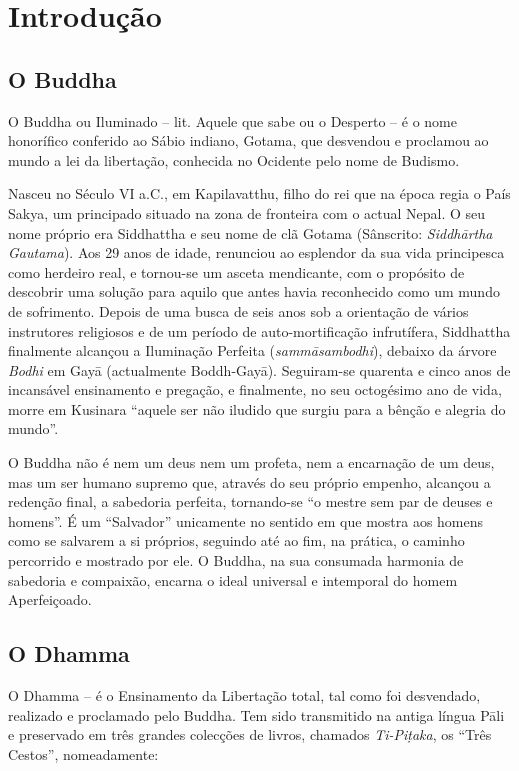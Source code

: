 \chapter{Introdução}

\section{O Buddha}

O Buddha ou Iluminado -- lit. Aquele que sabe ou o Desperto -- é o nome
honorífico conferido ao Sábio indiano, Gotama, que desvendou e proclamou ao
mundo a lei da libertação, conhecida no Ocidente pelo nome de Budismo.

Nasceu no Século VI a.C., em Kapilavatthu, filho do rei que na época regia o
País Sakya, um principado situado na zona de fronteira com o actual Nepal. O seu
nome próprio era Siddhattha e seu nome de clã Gotama (Sânscrito:
\emph{Siddhārtha Gautama}). Aos 29 anos de idade, renunciou ao esplendor da sua
vida principesca como herdeiro real, e tornou-se um asceta mendicante, com o
propósito de descobrir uma solução para aquilo que antes havia reconhecido como
um mundo de sofrimento. Depois de uma busca de seis anos sob a orientação de
vários instrutores religiosos e de um período de auto-mortificação infrutífera,
Siddhattha finalmente alcançou a Iluminação Perfeita (\emph{sammāsambodhi}),
debaixo da árvore \emph{Bodhi} em Gayā (actualmente Boddh-Gayā). Seguiram-se
quarenta e cinco anos de incansável ensinamento e pregação, e finalmente, no seu
octogésimo ano de vida, morre em Kusinara ``aquele ser não iludido que surgiu
para a bênção e alegria do mundo''.

O Buddha não é nem um deus nem um profeta, nem a encarnação de um deus, mas um
ser humano supremo que, através do seu próprio empenho, alcançou a redenção
final, a sabedoria perfeita, tornando-se ``o mestre sem par de deuses e
homens''. É um ``Salvador'' unicamente no sentido em que mostra aos homens como
se salvarem a si próprios, seguindo até ao fim, na prática, o caminho percorrido
e mostrado por ele. O Buddha, na sua consumada harmonia de sabedoria e
compaixão, encarna o ideal universal e intemporal do homem Aperfeiçoado.

\section{O Dhamma}

O Dhamma -- é o Ensinamento da Libertação total, tal como foi desvendado, realizado e proclamado pelo Buddha. Tem sido transmitido na antiga língua Pāli e preservado em três grandes colecções de livros, chamados \emph{Ti-Piṭaka}, os ``Três Cestos'', nomeadamente:


